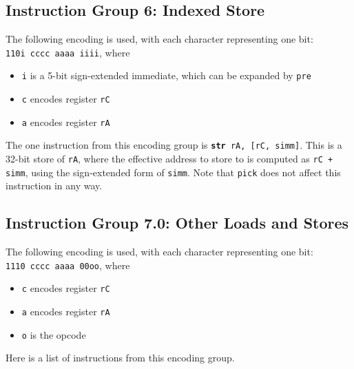 \documentclass{article}
\begin{document}
	\subsection{Instruction Group 6:  Indexed Store}
	The following encoding is used, with each character representing one
	bit:  \\
	\texttt{110i cccc aaaa iiii}, where

	\singlespacing
	\begin{itemize}
		\item \texttt{i} is a 5-bit sign-extended immediate, which can
		be expanded by \texttt{pre}  
		\item \texttt{c} encodes register \texttt{rC}
		\item \texttt{a} encodes register \texttt{rA}
	\end{itemize}
	\doublespacing

	The one instruction from this encoding group is
	\texttt{\textbf{str} rA, [rC, simm]}.
	This is a 32-bit store of \texttt{rA}, where the effective address to
	store to is computed as \texttt{rC + simm}, using the sign-extended
	form of \texttt{simm}.  Note that \texttt{pick} does not affect this
	instruction in any way.

	\subsection{Instruction Group 7.0:  Other Loads and Stores}
	The following encoding is used, with each character representing one
	bit:  \\
	\texttt{1110 cccc aaaa 00oo}, where

	\singlespacing
	\begin{itemize}
		\item \texttt{c} encodes register \texttt{rC}
		\item \texttt{a} encodes register \texttt{rA}
		\item \texttt{o} is the opcode
	\end{itemize}
	\doublespacing

	Here is a list of instructions from this encoding group.
\end{document}
